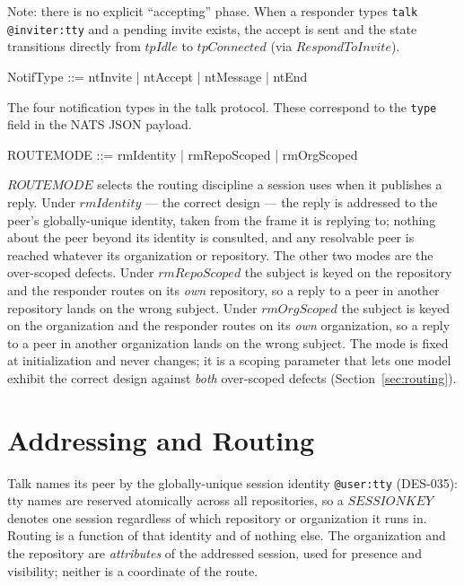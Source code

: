 \documentclass[a4paper,10pt,fleqn]{article}
\begin{document}
Note: there is no explicit ``accepting'' phase.  When a responder
types \texttt{talk @inviter:tty} and a pending invite exists, the
accept is sent and the state transitions directly from $tpIdle$
to $tpConnected$ (via $RespondToInvite$).

\begin{zed}
  NotifType ::= ntInvite | ntAccept | ntMessage | ntEnd
\end{zed}

The four notification types in the talk protocol.  These correspond
to the \texttt{type} field in the NATS JSON payload.

\begin{zed}
  ROUTEMODE ::= rmIdentity | rmRepoScoped | rmOrgScoped
\end{zed}

$ROUTEMODE$ selects the routing discipline a session uses when it
publishes a reply.  Under $rmIdentity$ --- the correct design --- the
reply is addressed to the peer's globally-unique identity, taken from the
frame it is replying to; nothing about the peer beyond its identity is
consulted, and any resolvable peer is reached whatever its organization
or repository.  The other two modes are the over-scoped defects.  Under
$rmRepoScoped$ the subject is keyed on the repository and the responder
routes on its \emph{own} repository, so a reply to a peer in another
repository lands on the wrong subject.  Under $rmOrgScoped$ the subject
is keyed on the organization and the responder routes on its \emph{own}
organization, so a reply to a peer in another organization lands on the
wrong subject.  The mode is fixed at initialization and never changes; it
is a scoping parameter that lets one model exhibit the correct design
against \emph{both} over-scoped defects (Section~\ref{sec:routing}).

\section{Addressing and Routing}
\label{sec:addressing}

Talk names its peer by the globally-unique session identity
\texttt{@user:tty} (DES-035): tty names are reserved atomically across
all repositories, so a $SESSIONKEY$ denotes one session regardless of
which repository or organization it runs in.  Routing is a function of
that identity and of nothing else.  The organization and the repository
are \emph{attributes} of the addressed session, used for presence and
visibility; neither is a coordinate of the route.
\end{document}
